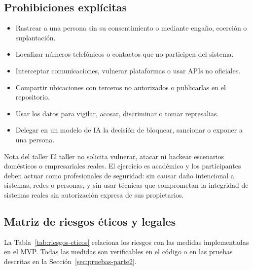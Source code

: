 \subsection{Prohibiciones explícitas}

\begin{itemize}[leftmargin=*, topsep=2pt, itemsep=2pt]
	\item Rastrear a una persona sin su consentimiento o mediante engaño, coerción o suplantación.
	\item Localizar números telefónicos o contactos que no participen del sistema.
	\item Interceptar comunicaciones, vulnerar plataformas o usar APIs no oficiales.
	\item Compartir ubicaciones con terceros no autorizados o publicarlas en el repositorio.
	\item Usar los datos para vigilar, acosar, discriminar o tomar represalias.
	\item Delegar en un modelo de IA la decisión de bloquear, sancionar o exponer a una persona.
\end{itemize}

\begin{nota}{Nota del taller}
El taller no solicita vulnerar, atacar ni hackear escenarios domésticos o empresariales reales. El ejercicio es académico y los participantes deben actuar como profesionales de seguridad: sin causar daño intencional a sistemas, redes o personas, y sin usar técnicas que comprometan la integridad de sistemas reales sin autorización expresa de sus propietarios.
\end{nota}

\subsection{Matriz de riesgos éticos y legales}

La Tabla~\ref{tab:riesgos-eticos} relaciona los riesgos con las medidas implementadas en el MVP. Todas las medidas son verificables en el código o en las pruebas descritas en la Sección~\ref{sec:pruebas-parte2}.

